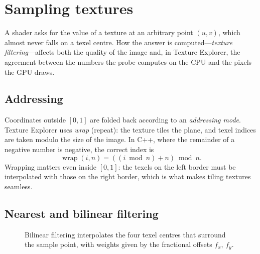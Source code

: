 \chapter{Sampling textures}
\label{ch:sampling}

A shader asks for the value of a texture at an arbitrary point $(u,v)$, which almost never
falls on a texel centre. How the answer is computed---\emph{texture filtering}---affects both
the quality of the image and, in Texture Explorer, the agreement between the numbers the
probe computes on the CPU and the pixels the GPU draws.

\section{Addressing}
Coordinates outside $[0,1]$ are folded back according to an \emph{addressing mode}. Texture
Explorer uses \emph{wrap} (repeat): the texture tiles the plane, and texel indices are taken
modulo the size of the image. In C++, where the remainder of a negative number is negative,
the correct index is
\[
  \operatorname{wrap}(i,n) = ((i \bmod n) + n) \bmod n .
\]
Wrapping matters even inside $[0,1]$: the texels on the left border must be interpolated with
those on the right border, which is what makes tiling textures seamless.

\section{Nearest and bilinear filtering}

\begin{figure}[ht]
\centering
{}
\caption{Bilinear filtering interpolates the four texel centres that surround the sample
point, with weights given by the fractional offsets $f_x$, $f_y$.}
\label{fig:bilinear}
\end{figure}

